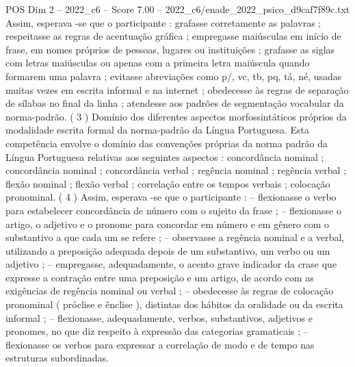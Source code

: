 \begin{textsample}{POS Dim 2 – 2022\_c6 – Score 7.00 – 2022\_c6/enade\_2022\_psico\_d9caf7f89c.txt}
Assim, esperava -se que o participante : grafasse corretamente as palavras ; respeitasse as regras de acentuação gráfica ; empregasse maiúsculas em início de frase, em nomes próprios de pessoas, lugares ou instituições ; grafasse as siglas com letras maiúsculas ou apenas com a primeira letra maiúscula quando formarem uma palavra ; evitasse abreviações como p/, vc, tb, pq, tá, né, usadas muitas vezes em escrita informal e na internet ; obedecesse às regras de separação de sílabas no final da linha ; atendesse aos padrões de segmentação vocabular da norma-padrão. ( 3 ) Domínio dos diferentes aspectos morfossintáticos próprios da modalidade escrita formal da norma-padrão da Língua Portuguesa.
Esta competência envolve o domínio das convenções próprias da norma padrão da Língua Portuguesa relativas aos seguintes aspectos : concordância nominal ; concordância nominal ; concordância verbal ; regência nominal ; regência verbal ; flexão nominal ; flexão verbal ; correlação entre os tempos verbais ; colocação pronominal. ( 4 ) Assim, esperava -se que o participante : – flexionasse o verbo para estabelecer concordância de número com o sujeito da frase ; – flexionasse o artigo, o adjetivo e o pronome para concordar em número e em gênero com o substantivo a que cada um se refere ; – observasse a regência nominal e a verbal, utilizando a preposição adequada depois de um substantivo, um verbo ou um adjetivo ; – empregasse, adequadamente, o acento grave indicador da crase que expresse a contração entre uma preposição e um artigo, de acordo com as exigências de regência nominal ou verbal ; – obedecesse às regras de colocação pronominal ( próclise e ênclise ), distintas dos hábitos da oralidade ou da escrita informal ; – flexionasse, adequadamente, verbos, substantivos, adjetivos e pronomes, no que diz respeito à expressão das categorias gramaticais ; – flexionasse os verbos para expressar a correlação de modo e de tempo nas estruturas subordinadas.

\end{textsample}
